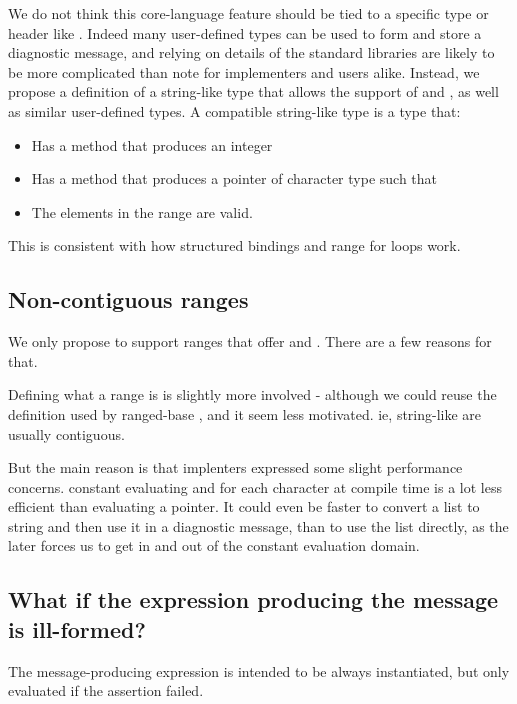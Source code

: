 \documentclass{wg21}
\begin{document}
We do not think this core-language feature should be tied to a specific type or header like .
Indeed many user-defined types can be used to form and store a diagnostic message, and relying on details of the standard libraries are likely to be more complicated than note for
implementers and users alike.
Instead, we propose a definition of a string-like type that allows the support of  and , as well as similar user-defined types.
A compatible string-like type is a type that:
\begin{itemize}
 \item Has a  method that produces an integer
 \item Has a  method that produces a pointer of character type such that
 \item The elements in the range \tcode{[data(), data()+size())} are valid.
\end{itemize}

This is consistent with how structured bindings and range for loops work.

\subsection{Non-contiguous ranges}

We only propose to support ranges that offer  and .
There are a few reasons for that.

Defining what a range is is slightly more involved - although we could reuse the definition used by ranged-base , and it seem less motivated.
ie, string-like are usually contiguous.

But the main reason is that implenters expressed some slight performance concerns.
constant evaluating  and  for each character at compile time is a lot less efficient than evaluating a pointer.
It could even be faster to convert a list to string and then use it in a diagnostic message, than to use the list directly, as the later forces
us to get in and out of the constant evaluation domain.

\subsection{What if the expression producing the message is ill-formed?}

The message-producing expression is intended to be always instantiated, but only evaluated if the assertion failed.
\end{document}
